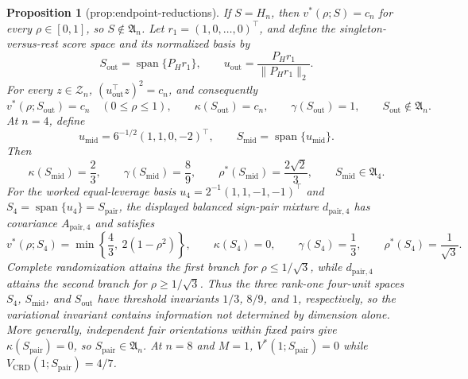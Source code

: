 \documentclass{article}
\newtheorem{proposition}{Proposition}
\begin{document}
\begin{proposition}[prop:endpoint-reductions]\label{prop:endpoint-reductions}
If \(S=H_n\), then \(v^*(\rho;S)=c_n\) for every \(\rho\in[0,1]\), so \(S\notin\mathfrak A_n\). Let \(r_1=(1,0,\ldots,0)^\top\), and define the singleton-versus-rest score space and its normalized basis by
\[
S_{\mathrm{out}}=\operatorname{span}\{P_Hr_1\},
\qquad
u_{\mathrm{out}}=\frac{P_Hr_1}{\|P_Hr_1\|_2}.
\]
For every \(z\in\mathcal Z_n\), \((u_{\mathrm{out}}^\top z)^2=c_n\), and consequently
\[
v^*(\rho;S_{\mathrm{out}})=c_n\quad(0\leq\rho\leq1),
\qquad
\kappa(S_{\mathrm{out}})=c_n,
\qquad
\gamma(S_{\mathrm{out}})=1,
\qquad
S_{\mathrm{out}}\notin\mathfrak A_n.
\]
At \(n=4\), define
\[
u_{\mathrm{mid}}=6^{-1/2}(1,1,0,-2)^\top,
\qquad
S_{\mathrm{mid}}=\operatorname{span}\{u_{\mathrm{mid}}\}.
\]
Then
\[
\kappa(S_{\mathrm{mid}})=\frac23,
\qquad
\gamma(S_{\mathrm{mid}})=\frac89,
\qquad
\rho^*(S_{\mathrm{mid}})=\frac{2\sqrt2}{3},
\qquad
S_{\mathrm{mid}}\in\mathfrak A_4.
\]
For the worked equal-leverage basis \(u_4=2^{-1}(1,1,-1,-1)^\top\) and \(S_4=\operatorname{span}\{u_4\}=S_{\mathrm{pair}}\), the displayed balanced sign-pair mixture \(d_{\mathrm{pair},4}\) has covariance \(A_{\mathrm{pair},4}\) and satisfies
\[
v^*(\rho;S_4)=\min\left\{\frac43,\ 2(1-\rho^2)\right\},
\qquad
\kappa(S_4)=0,
\qquad
\gamma(S_4)=\frac13,
\qquad
\rho^*(S_4)=\frac1{\sqrt3}.
\]
Complete randomization attains the first branch for \(\rho\leq1/\sqrt3\), while \(d_{\mathrm{pair},4}\) attains the second branch for \(\rho\geq1/\sqrt3\). Thus the three rank-one four-unit spaces \(S_4\), \(S_{\mathrm{mid}}\), and \(S_{\mathrm{out}}\) have threshold invariants \(1/3\), \(8/9\), and \(1\), respectively, so the variational invariant contains information not determined by dimension alone. More generally, independent fair orientations within fixed pairs give \(\kappa(S_{\mathrm{pair}})=0\), so \(S_{\mathrm{pair}}\in\mathfrak A_n\). At \(n=8\) and \(M=1\), \(V^*(1;S_{\mathrm{pair}})=0\) while \(V_{\mathrm{CRD}}(1;S_{\mathrm{pair}})=4/7\).
\end{proposition}
\end{document}
